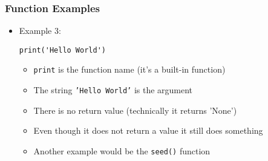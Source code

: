 \documentclass[english,14pt]{beamer}
\begin{document}
\begin{frame}[fragile]
\frametitle{Function Examples}
\begin{itemize}
\item Example 3:
\begin{lstlisting}[style=CStyle]
print('Hello World')
\end{lstlisting}
	\begin{itemize}
		\item \texttt{print} is the function name (it's a built-in function)
		\item The string \texttt{'Hello World'} is the argument
		\item There is no return value (technically it returns 'None')
		\item Even though it does not return a value it still does something
		\item Another example would be the \texttt{seed()} function
	\end{itemize}
\end{itemize}
\end{frame}


\end{document}
